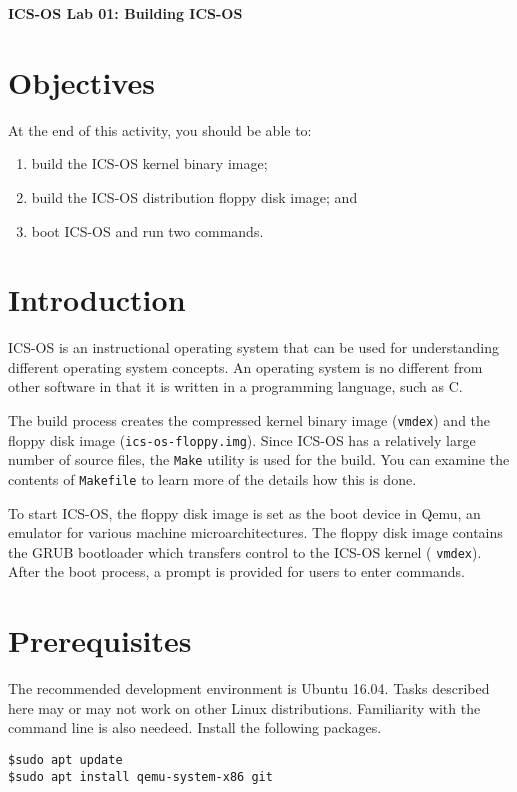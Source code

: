 \documentclass[a4paper, 11pt,oneside]{article}
\begin{document}
\begin{center}
	{\LARGE \textbf{ICS-OS Lab 01: Building ICS-OS}}
\end{center}

\section*{Objectives}
   At the end of this activity, you should be able to:
   \begin{enumerate}[itemsep=0pt,parsep=0pt]
       \item build the ICS-OS kernel binary image;
       \item build the ICS-OS distribution floppy disk image; and
       \item boot ICS-OS and run two commands.
   \end{enumerate}   

\section{Introduction}
ICS-OS is an instructional operating system that can be used for understanding different operating system concepts.  An operating system is no different from other software in that it is written in a programming language, such as C. 

The build process creates the compressed kernel binary image (\texttt{vmdex}) and the floppy disk image (\texttt{ics-os-floppy.img}). Since ICS-OS has a relatively large number of source files, 
the \texttt{Make} utility is used for the build. You can examine the contents of \texttt{Makefile} 
to learn more of the details how this is done.

To start ICS-OS, the floppy disk image is set as the boot device in Qemu,  
an emulator for various machine microarchitectures. The floppy disk image 
contains the GRUB bootloader which transfers control to the ICS-OS kernel ( 
\texttt{vmdex}). After the boot process, a prompt is provided for users to 
enter commands. 

\section{Prerequisites}
The recommended development environment is Ubuntu 16.04. Tasks described here 
may or may not work on other Linux distributions. Familiarity with the command 
line is also needeed. Install the following packages.

\begin{verbatim}
$sudo apt update
$sudo apt install qemu-system-x86 git
\end{verbatim}
\end{document}
